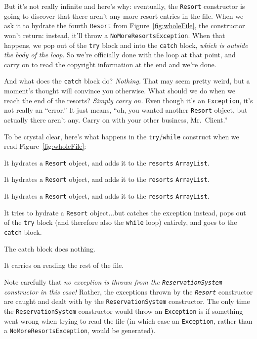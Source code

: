 But it's not really infinite and here's why: eventually, the \texttt{Resort}
constructor is going to discover that there aren't any more resort entries in
the file. When we ask it to hydrate the fourth \texttt{Resort} from
Figure~\ref{fig:wholeFile}, the constructor won't return: instead, it'll throw
a \texttt{NoMoreResortsException}. When that happens, we pop out of the
\texttt{try} block and into the \texttt{catch} block, \textit{which is outside
the body of the loop}. So we're officially done with the loop at that point,
and carry on to read the copyright information at the end and we're done.

And what does the \texttt{catch} block do? \textit{Nothing.} That may seem
pretty weird, but a moment's thought will convince you otherwise. What should
we do when we reach the end of the resorts? \textit{Simply carry on.} Even
though it's an \texttt{Exception}, it's not really an ``error.'' It just
means, ``oh, you wanted another \texttt{Resort} object, but actually there
aren't any. Carry on with your other business, Mr.~Client.''

To be crystal clear, here's what happens in the \texttt{try}/\texttt{while}
construct when we read Figure~\ref{fig:wholeFile}:

\begin{compactenum}
\item It hydrates a \texttt{Resort} object, and adds it to the
\texttt{resorts} \texttt{ArrayList}.
\item It hydrates a \texttt{Resort} object, and adds it to the
\texttt{resorts} \texttt{ArrayList}.
\item It hydrates a \texttt{Resort} object, and adds it to the
\texttt{resorts} \texttt{ArrayList}.
\item It tries to hydrate a \texttt{Resort} object...but catches the exception
instead, pops out of the \texttt{try} block (and therefore also the
\texttt{while} loop) entirely, and goes to the \texttt{catch} block.
\item The catch block does nothing.
\item It carries on reading the rest of the file.
\end{compactenum}

Note carefully that \textit{no exception is thrown from the
\texttt{ReservationSystem} constructor in this case!} Rather, the exceptions
thrown by the \textit{\texttt{Resort}} constructor are caught and dealt with
by the \texttt{ReservationSystem} constructor. The only time the
\texttt{ReservationSystem} constructor would throw an \texttt{Exception} is if
something went wrong when trying to read the file (in which case an
\texttt{Exception}, rather than a \texttt{NoMoreResortsException}, would be
generated).

